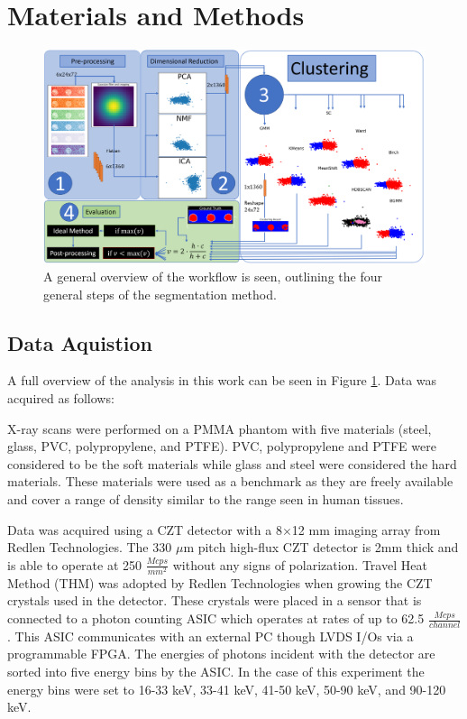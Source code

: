 \documentclass[a4paper,11pt]{article}
\begin{document}

\section{Materials and Methods}
\label{sec:methods}

\begin{figure}[htbp]

\includegraphics[width=\textwidth]{figures/flow_chart.png}

\caption{A general overview of the workflow is seen, outlining the four general steps of the segmentation method.}
\label{overview}
\end{figure}

\subsection{Data Aquistion}

A full overview of the analysis in this work can be seen in Figure \ref{overview}. Data was acquired as follows:

X-ray scans were performed on a PMMA phantom with five materials (steel, glass, PVC, polypropylene, and PTFE). PVC, polypropylene and PTFE were considered to be the soft materials while glass and steel were considered the hard materials. These materials were used as a benchmark as they are freely available and cover a range of density similar to the range seen in human tissues.

Data was acquired using a CZT detector with a 8$\times$12 mm imaging array from Redlen Technologies. The 330 $\mu$m pitch high-flux CZT detector is 2mm thick and is able to operate at 250 $\frac{Mcps}{mm^2}$ without any signs of polarization. Travel Heat Method (THM) was adopted by Redlen Technologies when growing the CZT crystals used in the detector. These crystals were placed in a sensor that is connected to a photon counting ASIC which operates at rates of up to 62.5 $\frac{Mcps}{channel}$. This ASIC communicates with an external PC though LVDS I/Os via a programmable FPGA. The energies of photons incident with the detector are sorted into five energy bins by the ASIC. In the case of this experiment the energy bins were set to 16-33 keV, 33-41 keV, 41-50 keV, 50-90 keV, and 90-120 keV.
\end{document}

